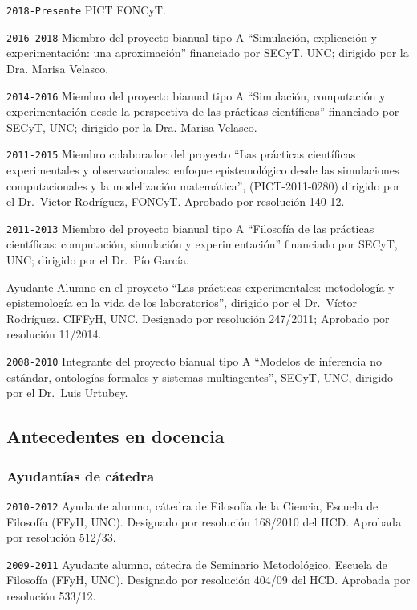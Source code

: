 \documentclass[]{article}
\begin{document}
\texttt{2018-Presente} PICT FONCyT.

\texttt{2016-2018} Miembro del proyecto bianual tipo A ``Simulación,
explicación y experimentación: una aproximación'' financiado por SECyT,
UNC; dirigido por la Dra. Marisa Velasco.

\texttt{2014-2016} Miembro del proyecto bianual tipo A ``Simulación,
computación y experimentación desde la perspectiva de las prácticas
científicas'' financiado por SECyT, UNC; dirigido por la Dra. Marisa
Velasco.

\texttt{2011-2015} Miembro colaborador del proyecto ``Las prácticas
científicas experimentales y observacionales: enfoque epistemológico
desde las simulaciones computacionales y la modelización matemática'',
(PICT-2011-0280) dirigido por el Dr.~Víctor Rodríguez, FONCyT. Aprobado
por resolución 140-12.

\texttt{2011-2013} Miembro del proyecto bianual tipo A ``Filosofía de
las prácticas científicas: computación, simulación y experimentación''
financiado por SECyT, UNC; dirigido por el Dr.~Pío García.

Ayudante Alumno en el proyecto ``Las prácticas experimentales:
metodología y epistemología en la vida de los laboratorios'', dirigido
por el Dr.~Víctor Rodríguez. CIFFyH, UNC. Designado por resolución
247/2011; Aprobado por resolución 11/2014.

\texttt{2008-2010} Integrante del proyecto bianual tipo A ``Modelos de
inferencia no estándar, ontologías formales y sistemas multiagentes'',
SECyT, UNC, dirigido por el Dr.~Luis Urtubey. 


\hypertarget{antecedentes-en-docencia}{%
\subsection{Antecedentes en
docencia}\label{antecedentes-en-docencia}}
\hypertarget{ayudantuxedas-de-cuxe1tedra}{%
\subsubsection{Ayudantías de
cátedra}\label{ayudantuxedas-de-cuxe1tedra}}

\texttt{2010-2012} Ayudante alumno, cátedra de Filosofía de la Ciencia,
Escuela de Filosofía (FFyH, UNC). Designado por resolución 168/2010 del
HCD. Aprobada por resolución 512/33.

\texttt{2009-2011} Ayudante alumno, cátedra de Seminario Metodológico,
Escuela de Filosofía (FFyH, UNC). Designado por resolución 404/09 del
HCD. Aprobada por resolución 533/12.
\end{document}
